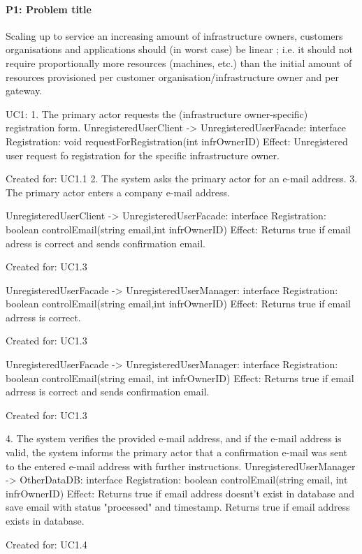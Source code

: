     \paragraph{P1: Problem title}
        Scaling up to service an increasing amount of infrastructure owners,
        customers organisations and applications should (in worst case) be linear ;
        i.e. it should not require proportionally more resources (machines, etc.)
        than the initial amount of resources provisioned per customer
        organisation/infrastructure owner and per gateway.
        
        
    UC1:
    1. The primary actor requests the (infrastructure owner-specific) registration form.
        UnregisteredUserClient -> UnregisteredUserFacade: interface Registration:
                                         void requestForRegistration(int infrOwnerID)
            Effect: Unregistered user request fo registration for the specific infrastructure owner.
            \item Created for: UC1.1
    2. The system asks the primary actor for an e-mail address.
    3. The primary actor enters a company e-mail address.
        
        UnregisteredUserClient -> UnregisteredUserFacade: interface Registration:
                                         boolean controlEmail(string email,int infrOwnerID)
            Effect: Returns true if email adress is correct and sends confirmation email.
            \item Created for: UC1.3
            
        UnregisteredUserFacade -> UnregisteredUserManager: interface Registration:
                                  boolean controlEmail(string email,int infrOwnerID)
             Effect: Returns true if email adrress is correct.
            \item Created for: UC1.3
            
        UnregisteredUserFacade -> UnregisteredUserManager: interface Registration:
                                  boolean controlEmail(string email, int infrOwnerID)
             Effect: Returns true if email adrress is correct and sends confirmation email.
            \item Created for: UC1.3
            
 
            
   4. The system verifies the provided e-mail address, and if the e-mail address is valid, the system
    informs the primary actor that a confirmation e-mail was sent to the entered e-mail address
    with further instructions.
           UnregisteredUserManager -> OtherDataDB: interface Registration:
                                  boolean controlEmail(string email, int infrOwnerID)
             Effect: Returns true if email address doesnt't exist in database and save email with status "processed" and timestamp.
                     Returns true if email address exists in database.
            \item Created for: UC1.4

